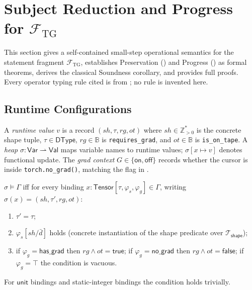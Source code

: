 
\providecommand{\llbracket}{[\![}
\providecommand{\rrbracket}{]\!]}

\section{Subject Reduction and Progress for
         \texorpdfstring{$\mathcal{F}_{\mathrm{TG}}$}{F-TG}}
\label{app:subject-reduction}

This section gives a self-contained small-step operational semantics for the
statement fragment $\mathcal{F}_{\mathrm{TG}}$, establishes Preservation
() and Progress () as formal theorems,
derives the classical Soundness corollary, and provides full proofs.
Every operator typing rule cited is from ;
no rule is invented here.

\subsection{Runtime Configurations}
\label{app:sos-configs}

A \emph{runtime value} $v$ is a record
$(\mathit{sh},\tau,\mathit{rg},\mathit{ot})$ where
$\mathit{sh}\in\mathbb{Z}_{>0}^{*}$ is the concrete shape tuple,
$\tau\in\mathsf{DType}$, $\mathit{rg}\in\mathbb{B}$ is
\texttt{requires\_grad}, and $\mathit{ot}\in\mathbb{B}$ is
\texttt{is\_on\_tape}.
A \emph{heap} $\sigma:\mathsf{Var}\rightharpoonup\mathsf{Val}$ maps variable
names to runtime values; $\sigma[x\mapsto v]$ denotes functional update.
The \emph{grad context} $G\in\{\mathsf{on},\mathsf{off}\}$ records whether
the cursor is inside \texttt{torch.no\_grad()}, matching the flag in
.

\begin{definition}
\label{def:heap-satisfaction}
$\sigma\models\Gamma$ iff for every binding
$x:\mathsf{Tensor}[\tau,\varphi_s,\varphi_g]\in\Gamma$,
writing $\sigma(x)=(\mathit{sh},\tau',\mathit{rg},\mathit{ot})$:
\begin{enumerate}
  \item $\tau'=\tau$;
  \item $\varphi_s[\mathit{sh}/\bar d]$ holds (concrete instantiation
        of the shape predicate over $\mathcal{T}_{\mathsf{shape}}$);
  \item if $\varphi_g=\mathsf{has\_grad}$ then $\mathit{rg}\wedge\mathit{ot}=\mathsf{true}$;
        if $\varphi_g=\mathsf{no\_grad}$ then $\mathit{rg}\wedge\mathit{ot}=\mathsf{false}$;
        if $\varphi_g=\top$ the condition is vacuous.
\end{enumerate}
For $\mathsf{unit}$ bindings and static-integer bindings the condition holds
trivially.
\end{definition}

